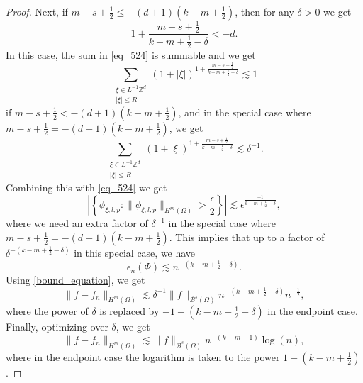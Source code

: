 \begin{proof}
 
 Next, if $m-s+\frac{1}{2} \leq -(d+1)\left(k-m+\frac{1}{2}\right)$, then for any $\delta > 0$ we get
 \begin{equation}
  1 + \frac{m-s+\frac{1}{2}}{k-m+\frac{1}{2}-\delta} < -d.
 \end{equation}
 In this case, the sum in \eqref{eq_524} is summable and we get
 \begin{equation}
  \sum_{\substack{\xi\in L^{-1}\mathbb{Z}^d\\|\xi|\leq R}} (1+|\xi|)^{1 + \frac{m-s+\frac{1}{2}}{k-m+\frac{1}{2}-\delta}} \lesssim 1
 \end{equation}
 if $m-s+\frac{1}{2} < -(d+1)\left(k-m+\frac{1}{2}\right)$, and in the special case where $m-s+\frac{1}{2} = -(d+1)\left(k-m+\frac{1}{2}\right)$, we get
\begin{equation}
  \sum_{\substack{\xi\in L^{-1}\mathbb{Z}^d\\|\xi|\leq R}} (1+|\xi|)^{1 + \frac{m-s+\frac{1}{2}}{k-m+\frac{1}{2}-\delta}} \lesssim \delta^{-1}.
 \end{equation}
 Combining this with \eqref{eq_524} we get
 \begin{equation}
  \left|\left\{\phi_{\xi,l,p}: \|\phi_{\xi,l,p}\|_{H^m(\Omega)} > \frac{\epsilon}{2}\right\}\right| \lesssim \epsilon^{\frac{-1}{k-m+\frac{1}{2}-\delta}},
 \end{equation}
 where we need an extra factor of $\delta^{-1}$ in the special case where $m-s+\frac{1}{2} = -(d+1)\left(k-m+\frac{1}{2}\right)$.
 This implies that up to a factor of $\delta^{-(k-m+\frac{1}{2}-\delta)}$ in this special case, we have
 \begin{equation}
  \epsilon_n(\Phi) \lesssim n^{-(k-m+\frac{1}{2}-\delta)}.
 \end{equation}
 Using \eqref{bound_equation}, we get
 \begin{equation}
  \|f - f_n\|_{H^m(\Omega)} \lesssim \delta^{-1}\|f\|_{\mathcal{B}^s(\Omega)}n^{-(k-m+\frac{1}{2}-\delta)}n^{-\frac{1}{2}},
 \end{equation}
 where the power of $\delta$ is replaced by $-1-(k-m+\frac{1}{2}-\delta)$ in the endpoint case. Finally, optimizing over $\delta$, we get
 \begin{equation}\label{eq_580}
  \|f - f_n\|_{H^m(\Omega)} \lesssim \|f\|_{\mathcal{B}^s(\Omega)}n^{-(k-m+1)}\log(n),
 \end{equation}
 where in the endpoint case the logarithm is taken to the power $1 + (k-m+\frac{1}{2})$.
 

\end{proof}
